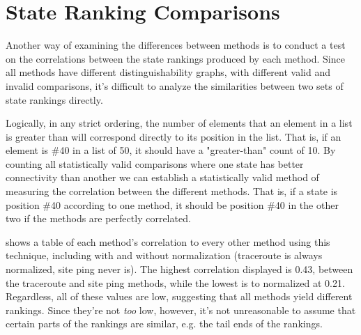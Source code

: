 \section{State Ranking Comparisons}\label{sec:comparative-correlations}

Another way of examining the differences between methods is to conduct a test on the correlations between the state rankings produced by each method. Since all methods have different distinguishability graphs, with different valid and invalid comparisons, it's difficult to analyze the similarities between two sets of state rankings directly.

Logically, in any strict ordering, the number of elements that an element in a list is greater than will correspond directly to its position in the list. That is, if an element is \#40 in a list of 50, it should have a "greater-than" count of 10. By counting all statistically valid comparisons where one state has better connectivity than another we can establish a statistically valid method of measuring the correlation between the different methods. That is, if a state is position \#40 according to one method, it should be position \#40 in the other two if the methods are perfectly correlated.



 shows a table of each method's correlation to every other method using this technique, including \dns with and without normalization (traceroute is always normalized, site ping never is). The highest correlation displayed is 0.43, between the traceroute and site ping methods, while the lowest is \dns to normalized \dns at 0.21. Regardless, all of these values are low, suggesting that all methods yield different rankings. Since they're not \textit{too} low, however, it's not unreasonable to assume that certain parts of the rankings are similar, e.g. the tail ends of the rankings.
